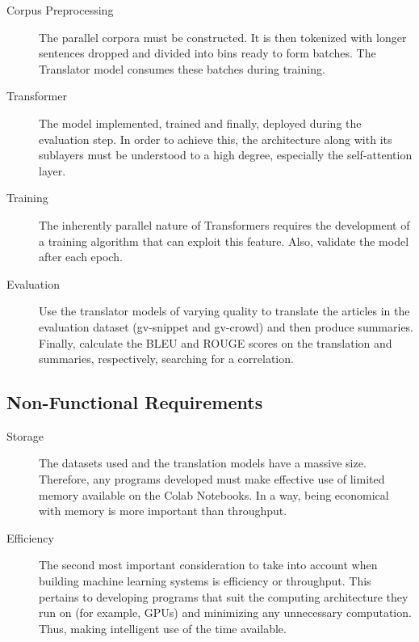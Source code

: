 \documentclass[12pt,a4paper,twoside,openright]{report}
\begin{document}
\begin{description}


\item[Corpus Preprocessing] The parallel corpora must be constructed. It is then tokenized with longer sentences dropped and divided into bins ready to form batches. The Translator model consumes these batches during training.

\item[Transformer] The model implemented, trained and finally, deployed during the evaluation step. In order to achieve this, the architecture along with its sublayers must be understood to a high degree, especially the self-attention layer.

\item[Training] The inherently parallel nature of Transformers requires the development of a training algorithm that can exploit this feature. Also, validate the model after each epoch.

\item[Evaluation] Use the translator models of varying quality to translate the articles in the evaluation dataset (gv-snippet and gv-crowd) and then produce summaries. Finally, calculate the BLEU and ROUGE scores on the translation and summaries, respectively, searching for a correlation.

\end{description}

\subsection{Non-Functional Requirements}
\label{non-functional-requirements}

\begin{description}
\item[Storage]
The datasets used and the translation models have a massive size. Therefore, any programs developed must make effective use of limited memory available on the Colab Notebooks. In a way, being economical with memory is more important than throughput.

\item[Efficiency]
The second most important consideration to take into account when building machine learning systems is efficiency or throughput. This pertains to developing programs that suit the computing architecture they run on (for example, GPUs) and minimizing any unnecessary computation. Thus, making intelligent use of the time available.
\end{description}
\end{document}
